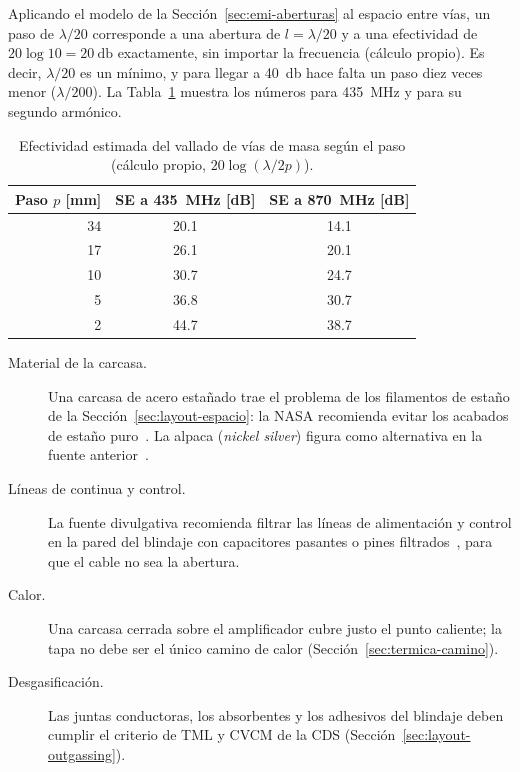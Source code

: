 Aplicando el modelo de la Sección~\ref{sec:emi-aberturas} al espacio entre vías, un paso de $\lambda/20$ corresponde a una abertura de $l = \lambda/20$ y a una efectividad de $20\log 10 = \SI{20}{\decibel}$ exactamente, sin importar la frecuencia (cálculo propio). Es decir, $\lambda/20$ es un mínimo, y para llegar a \SI{40}{\decibel} hace falta un paso diez veces menor ($\lambda/200$). La Tabla~\ref{tab:emi-paso} muestra los números para \SI{435}{\mega\hertz} y para su segundo armónico.

\begin{table}[H]
  \centering
  \caption[Efectividad del vallado de vías según su paso.]{Efectividad estimada del vallado de vías de masa según el paso (cálculo propio, $20\log (\lambda/2p)$).}\label{tab:emi-paso}
  \begin{tabular}{@{}rcc@{}}
    \toprule
    Paso $p$ [mm] & SE a \SI{435}{\mega\hertz} [dB] & SE a \SI{870}{\mega\hertz} [dB] \\
    \midrule
    34  & \num{20,1} & \num{14,1} \\
    17  & \num{26,1} & \num{20,1} \\
    10  & \num{30,7} & \num{24,7} \\
    5   & \num{36,8} & \num{30,7} \\
    2   & \num{44,7} & \num{38,7} \\
    \bottomrule
  \end{tabular}
\end{table}

\begin{description}
  \item[Material de la carcasa.] Una carcasa de acero estañado trae el problema de los filamentos de estaño de la Sección~\ref{sec:layout-espacio}: la NASA recomienda evitar los acabados de estaño puro~\cite{brusse}. La alpaca (\emph{nickel silver}) figura como alternativa en la fuente anterior~\cite{rfessentialsbls}. 
  \item[Líneas de continua y control.] La fuente divulgativa recomienda filtrar las líneas de alimentación y control en la pared del blindaje con capacitores pasantes o pines filtrados~\cite{rfessentialsbls}, para que el cable no sea la abertura.
  \item[Calor.] Una carcasa cerrada sobre el amplificador cubre justo el punto caliente; la tapa no debe ser el único camino de calor (Sección~\ref{sec:termica-camino}).
  \item[Desgasificación.] Las juntas conductoras, los absorbentes y los adhesivos del blindaje deben cumplir el criterio de TML y CVCM de la CDS (Sección~\ref{sec:layout-outgassing}). 
\end{description}

